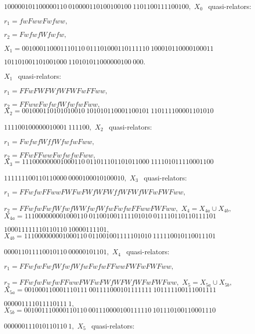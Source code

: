\hfill
$100000101100000110\ 
010000110100100100\ 
1101100111100100,$ 
\noindent  $X_0\ \ $ quasi\/{\rm -}\/relators\/{\rm :}

$r_1 = fwFwwFwfww,$
 
$r_2 = FwfwfWfwfw,$

\noindent $X_1 = 
001000110001110110\ 
011101000110111110\ 
100010110000100011$\hfill 

\hfill $
101101001101001000\ 
110101011000000100\ 
000.$ 
\pagebreak


\noindent $X_1\ \ 
$ quasi\/{\rm -}\/relators\/{\rm :}

$r_1 = FFwFWFWfWFWFwFFww,$
 
$r_2 = FFwwFwfwfWfwfwFww,$
\noindent $X_2 = 
001000110101010010\ 
101010110001100101\ 
110111100001101010$\hfill

\hfill $111100100000010001\ 
111100,$
\noindent $X_2\ \ $ quasi\/{\rm -}\/relators\/{\rm :}

$r_1 = FwfwfWffWfwfwFww,$

$r_2 = FFwFFwwFwfwfwFww,$
\noindent 
$X_3 = 
111000000001000110\ 
011011101101011000\ 
111101011110001100$\hfill

\hfill  
$111111100110110000\ 
0000100010100010,$
\noindent $X_3\ \ $ quasi\/{\rm -}\/relators\/{\rm :}\/

$r_1 = FFwfwFFwwFWFwFWfWFWffWFWfWFwFWFww,$ 

$r_2 = FFwfwFwfWfwfWWfwfWfwFwfwFFwwFWFww,$
\noindent $X_4 = X_{4a} \cup X_{4b},$
\vglue4pt
\noindent $X_{4a} = 
111000000001000110\ 
011001001111101010\ 
011110110110111101$\hfill

\hfill  
$100011111110110110\ 
10000111101,$
\noindent $X_{4b} = 
111000000001000110\ 
011001001111101010\ 
111110010110011101$\hfill

\hfill  
$000011011110010110\ 
00000101101,$
\noindent $X_4\ \ $ quasi\/{\rm -}\/relators\/{\rm :}

$r_1 = FFwfwFwfWfwfWfwFwfwFFwwFWFwFWFww,$

$r_2 = FFwfwFwfwFFwwFWFwFWfWFWfWFwFWFww,$
\vglue4pt
\noindent $X_5 = X_{5a} \cup X_{5b},$
\vglue4pt
\noindent $X_{5a} = 
001000110001110111\ 
001111000101111111\ 
101111100111001111$\hfill

\hfill 
$000001111011110111\ 1,$
\vglue4pt
\noindent  $X_{5b} = 
001001110000110110\ 
001110000100111110\ 
101110100110001110$\hfill

\hfill  
$000000111010110110\ 1,$
\vglue4pt
\noindent $X_5\ \ $ quasi\/{\rm -}\/relators\/{\rm :}

